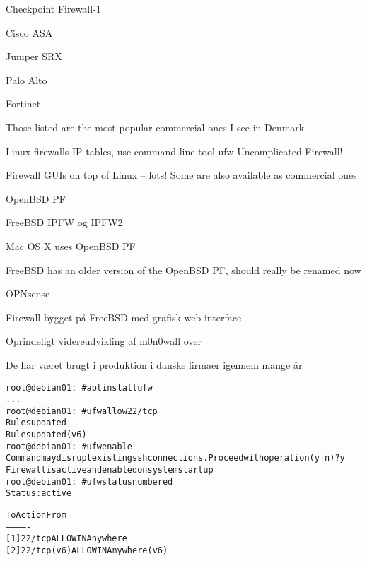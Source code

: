 \documentclass[Screen16to9,17pt]{foils}
\begin{document}
\begin{list2}
\item Checkpoint Firewall-1 
\item Cisco ASA 
\item Juniper SRX 
\item Palo Alto 
\item Fortinet 
\end{list2}

Those listed are the most popular commercial ones I see in Denmark


\begin{list2}
\item Linux firewalls IP tables, use command line tool ufw Uncomplicated Firewall!
\item Firewall GUIs on top of Linux -- lots! Some are also available as commercial ones
\item OpenBSD PF
\item FreeBSD IPFW og IPFW2 
\item Mac OS X uses OpenBSD PF
\item FreeBSD has an older version of the OpenBSD PF, should really be renamed now
\end{list2}



\begin{list1}
\item OPNsense 
\item Firewall bygget på FreeBSD med grafisk web interface
\item Oprindeligt videreudvikling af m0n0wall over \\
\item De har været brugt i produktion i danske firmaer igennem mange år
\end{list1}



\begin{alltt}\small
root@debian01:~# apt install ufw
...
root@debian01:~# ufw allow 22/tcp
Rules updated
Rules updated (v6)
root@debian01:~# ufw enable
Command may disrupt existing ssh connections. Proceed with operation (y|n)? y
Firewall is active and enabled on system startup
root@debian01:~# ufw status numbered
Status: active

     To                         Action      From
     --                         ------      ----
[ 1] 22/tcp                     ALLOW IN    Anywhere
[ 2] 22/tcp (v6)                ALLOW IN    Anywhere (v6)
\end{alltt}
\end{document}
